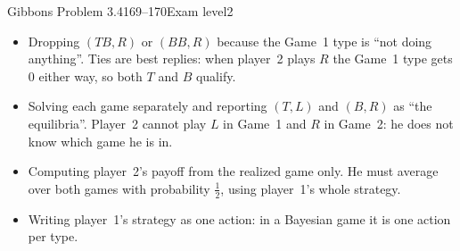 \begin{exsol}{Gibbons Problem 3.4}{169--170}{Exam level}{2}
\mistakes
\begin{itemize}
  \item Dropping $(TB,R)$ or $(BB,R)$ because the Game~1 type is ``not doing anything''. Ties are best
  replies: when player~2 plays $R$ the Game~1 type gets $0$ either way, so both $T$ and $B$ qualify.
  \item Solving each game separately and reporting $(T,L)$ and $(B,R)$ as ``the equilibria''. Player~2
  cannot play $L$ in Game~1 and $R$ in Game~2: he does not know which game he is in.
  \item Computing player~2's payoff from the realized game only. He must average over both games
  with probability $\frac12$, using player~1's whole strategy.
  \item Writing player~1's strategy as one action: in a Bayesian game it is one action per type.
\end{itemize}

\end{exsol}
